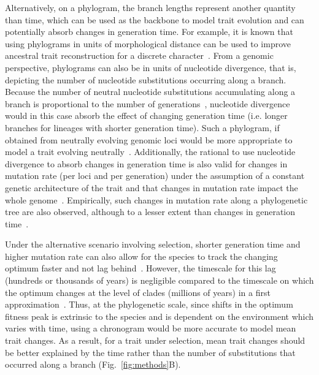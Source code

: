\documentclass{article}
\begin{document}
Alternatively, on a phylogram, the branch lengths represent another quantity than time, which can be used as the backbone to model trait evolution and can potentially absorb changes in generation time.
For example, it is known that using phylograms in units of morphological distance can be used to improve ancestral trait reconstruction for a discrete character~\citep{wilson_chronogram_2022}.
From a genomic perspective, phylograms can also be in units of nucleotide divergence, that is, depicting the number of nucleotide substitutions occurring along a branch.
Because the number of neutral nucleotide substitutions accumulating along a branch is proportional to the number of generations~\citep{kimura_evolutionary_1968, kimura_neutral_1983}, nucleotide divergence would in this case absorb the effect of changing generation time (i.e. longer branches for lineages with shorter generation time).
Such a phylogram, if obtained from neutrally evolving genomic loci would be more appropriate to model a trait evolving neutrally~\citep{latrille_detecting_2024}.
Additionally, the rational to use nucleotide divergence to absorb changes in generation time is also valid for changes in mutation rate (per loci and per generation) under the assumption of a constant genetic architecture of the trait and that changes in mutation rate impact the whole genome~\citep{latrille_detecting_2024}.
Empirically, such changes in mutation rate along a phylogenetic tree are also observed, although to a lesser extent than changes in generation time~\citep{bergeron_evolution_2023}.

Under the alternative scenario involving selection, shorter generation time and higher mutation rate can also allow for the species to track the changing optimum faster and not lag behind~\citep{lande_natural_1976, hansen_comparative_2008}.
However, the timescale for this lag (hundreds or thousands of years) is negligible compared to the timescale on which the optimum changes at the level of clades (millions of years) in a first approximation~\citep{hansen_three_2024}.
Thus, at the phylogenetic scale, since shifts in the optimum fitness peak is extrinsic to the species and is dependent on the environment which varies with time, using a chronogram would be more accurate to model mean trait changes.
As a result, for a trait under selection, mean trait changes should be better explained by the time rather than the number of substitutions that occurred along a branch (Fig.~\ref{fig:methods}B).
\end{document}
